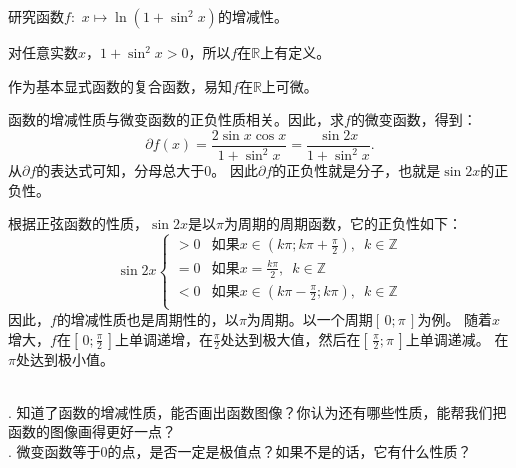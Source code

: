 \documentclass[12pt,UTF8]{ctexbook}
\begin{document}
\begin{et}
    研究函数$f:\,\,x\mapsto \ln(1 + \sin^2{x})$的增减性。
\end{et}

\begin{so}
    对任意实数$x$，$1 + \sin^2{x} > 0$，所以$f$在$\mathbb{R}$上有定义。

    作为基本显式函数的复合函数，易知$f$在$\mathbb{R}$上可微。

    函数的增减性质与微变函数的正负性质相关。因此，求$f$的微变函数，得到：
    $$ \partial f(x) = \frac{2\sin{x}\cos{x}}{1 + \sin^2{x}} = \frac{\sin{2x}}{1 + \sin^2{x}}.$$
    从$ \partial f $的表达式可知，分母总大于$0$。
    因此$ \partial f $的正负性就是分子，也就是$\sin{2x}$的正负性。

    根据正弦函数的性质，$\sin{2x}$是以$\pi$为周期的周期函数，它的正负性如下：
    $$ \sin{2x} \left\{
        \begin{array}{cl}
            > 0 & \mbox{如果}x \in (k\pi; k\pi + \frac{\pi}{2}),\,\,\, k\in\mathbb{Z} \\
            = 0 & \mbox{如果}x = \frac{k\pi}{2}, \,\,\,k\in\mathbb{Z} \\
            < 0 & \mbox{如果}x \in (k\pi - \frac{\pi}{2}; k\pi), \,\,\,k\in\mathbb{Z} \\
        \end{array}\right.
    $$
    因此，$f$的增减性质也是周期性的，以$\pi$为周期。以一个周期$[\,0; \pi\,]$为例。
    随着$x$增大，$f$在$[\,0; \frac{\pi}{2}\,]$上单调递增，在$\frac{\pi}{2}$处达到极大值，然后在$[\,\frac{\pi}{2}; \pi\,]$上单调递减。
    在$\pi$处达到极小值。
    
\end{so}

\begin{sk}
    \mbox{} \\
    . 知道了函数的增减性质，能否画出函数图像？你认为还有哪些性质，能帮我们把函数的图像画得更好一点？\\
    . 微变函数等于$0$的点，是否一定是极值点？如果不是的话，它有什么性质？    
\end{sk}
\end{document}
